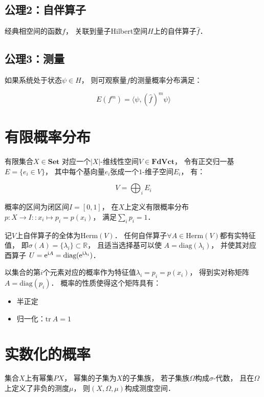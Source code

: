 \documentclass[10pt, openany]{book}
\begin{document}
\section{公理2：自伴算子}

经典相空间的函数$f$，
关联到量子Hilbert空间$H$上的自伴算子$\hat f$．

\section{公理3：测量}

如果系统处于状态$\psi \in H$，
则可观察量$f$的测量概率分布满足：

$$
E(f^m) = \langle \psi,(\hat f)^m\psi \rangle
$$


\chapter{有限概率分布}

有限集合$X\in\textbf{Set}$
对应一个$|X|$-维线性空间$V\in\textbf{FdVct}$，
令有正交归一基$E = \{e_i \in V\}$，
其中每个基向量$e_i$张成一个$1$-维子空间$E_i$，
有：

$$
V = \bigoplus_i E_i
$$

概率的区间为闭区间$I = [0,1]$，
在$X$上定义有限概率分布
$p: X \to I :: x_i \mapsto p_i = p(x_i)$，
满足$\sum_i p_i = 1$．

记$V$上自伴算子的全体为$\text{Herm}(V)$．
任何自伴算子$\forall A\in\text{Herm}(V)$都有实特征值，
即$\sigma(A) = \{ \lambda_i \} \subset \mathbb R$，
且适当选择基可以使
$A = \text{diag}(\lambda_i)$，
并使其对应酉算子
$U = \text e^{\text i A} = \text{diag}(\text e^{\text i \lambda_i})$．

以集合的第$i$个元素对应的概率作为特征值$\lambda_i = p_i = p(x_i)$，
得到实对称矩阵
$A = \text{diag}(p_i)$．
概率的性质使得这个矩阵具有：

\begin{itemize}
  \item 半正定
  \item 归一化：$\text{tr} \ A = 1$
\end{itemize}

\chapter{实数化的概率}

集合$X$上有幂集$PX$，
幂集的子集为$X$的子集族，
若子集族$\Omega$构成$\sigma$-代数，
且在$\Omega$上定义了非负的测度$\mu$，
则$(X,\Omega,\mu)$构成测度空间．
\end{document}
